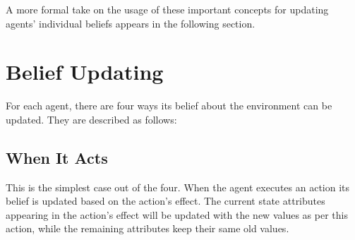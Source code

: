 \documentclass[letterpaper]{article} %
\newtheorem{definition}{Definition}
\begin{document}
A more formal take on the usage of these important concepts for updating agents' individual beliefs appears in the following section.   










\section{Belief Updating}
For each agent, there are four ways its belief about the environment can be updated. They are described as follows:

\subsection{When It Acts}
This is the simplest case out of the four. When the agent executes an action its belief is updated based on the action's effect. The current state attributes appearing in the action's effect will be updated with the new values as per this action, while the remaining attributes keep their same old values.  
\end{document}
